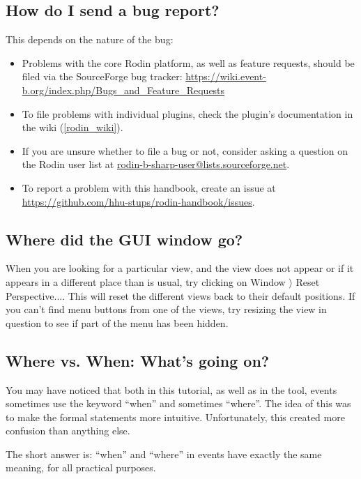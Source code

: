 \subsection{How do I send a bug report?}
\label{bug_report}

This depends on the nature of the bug:
\begin{itemize}
	\item Problems with the core Rodin platform, as well as feature requests, should be filed via the SourceForge bug tracker: \url{https://wiki.event-b.org/index.php/Bugs_and_Feature_Requests}
	\item To file problems with individual plugins, check the plugin's documentation in the wiki (\ref{rodin_wiki}).
	\item If you are unsure whether to file a bug or not, consider asking a question on the Rodin user list at \href{mailto:rodin-b-sharp-user@lists.sourceforge.net}{rodin-b-sharp-user@lists.sourceforge.net}.
	\item To report a problem with this handbook, create an issue at \url{https://github.com/hhu-stups/rodin-handbook/issues}.
\end{itemize}

\subsection{Where did the GUI window go?}

When you are looking for a particular view, and the view does not appear or if it appears in a different place than is usual, try clicking on \textsf{Window $\rangle $ Reset Perspective...}. This will reset the different views back to their default positions. If you can't find menu buttons from one of the views, try resizing the view in question to see if part of the menu has been hidden.

\subsection{Where vs. When: What's going on?}

You may have noticed that both in this tutorial, as well as in the tool, events sometimes use the keyword ``when'' and sometimes ``where''.  The idea of this was to make the formal statements more intuitive.  Unfortunately, this created more confusion than anything else.

The short answer is: ``when'' and ``where'' in events have exactly the same meaning, for all practical purposes.

